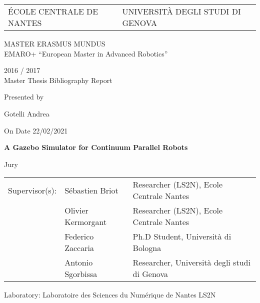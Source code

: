 \thispagestyle{empty}

\def\lskip{\vspace{0.5cm}}


\begin{tabular}{p{7cm}p{8cm}}
ÉCOLE CENTRALE DE NANTES
&
\raggedleft UNIVERSITÀ DEGLI STUDI DI GENOVA	
\end{tabular}

\vspace{2cm}


\begin{center} \large\sc MASTER ERASMUS MUNDUS \\ \normalsize{EMARO+ ``European Master in Advanced Robotics''} \end{center}


\begin{center}
	2016 / 2017\\
	\lskip
	Master Thesis Bibliography Report %
	\lskip
	
	Presented by \lskip 
	
	Gotelli Andrea \lskip
	
	On Date 22/02/2021\lskip\lskip
	
	{\Large \textbf{A Gazebo Simulator for Continuum Parallel Robots}}
	
	\vfill

Jury \lskip
		
	\end{center}
	


\begin{tabular}{p{3cm}p{7cm}p{5cm} }
  Supervisor(s):  	& Sébastien Briot & Researcher (LS2N), Ecole Centrale Nantes 	\\
		  			& Olivier Kermorgant & Researcher (LS2N), Ecole Centrale Nantes	\\
		  			& Federico Zaccaria & Ph.D Student, Università di Bologna	\\
					& Antonio Sgorbissa & Researcher, Università degli studi di Genova  
\end{tabular}

\lskip

\begin{flushleft}
 Laboratory: Laboratoire des Sciences du Numérique de Nantes LS2N
\end{flushleft}

\newpage
\thispagestyle{empty}
\null
\newpage
\addtocounter{page}{-1}
\pagestyle{fancy}
